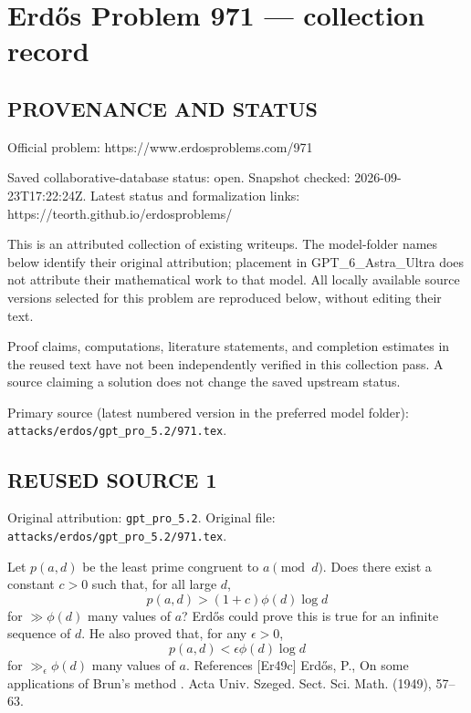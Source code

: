 \section*{Erd\H{o}s Problem 971 --- collection record}

\subsection*{PROVENANCE AND STATUS}
Official problem: https://www.erdosproblems.com/971

Saved collaborative-database status: open.
Snapshot checked: 2026-09-23T17:22:24Z.
Latest status and formalization links: https://teorth.github.io/erdosproblems/

This is an attributed collection of existing writeups. The model-folder names below identify their original attribution; placement in GPT\_6\_Astra\_Ultra does not attribute their mathematical work to that model. All locally available source versions selected for this problem are reproduced below, without editing their text.

Proof claims, computations, literature statements, and completion estimates in the reused text have not been independently verified in this collection pass. A source claiming a solution does not change the saved upstream status.

Primary source (latest numbered version in the preferred model folder): \texttt{attacks/erdos/gpt\_pro\_5.2/971.tex}.

\subsection*{REUSED SOURCE 1}
Original attribution: \texttt{gpt\_pro\_5.2}.
Original file: \texttt{attacks/erdos/gpt\_pro\_5.2/971.tex}.


Let $p(a,d)$ be the least prime congruent to $a\pmod{d}$. Does there exist a constant $c>0$ such that, for all large $d$,\[p(a,d) > (1+c)\phi(d)\log d\]for $\gg \phi(d)$ many values of $a$? Erd\H{o}s \cite{Er49c} could prove this is true for an infinite sequence of $d$. He also proved that, for any $\epsilon>0$,\[p(a,d)< \epsilon \phi(d)\log d\]for $\gg_\epsilon \phi(d)$ many values of $a$. References [Er49c] Erd\H{o}s, P., On some applications of {B}run's method . Acta Univ. Szeged. Sect. Sci. Math. (1949), 57--63.



